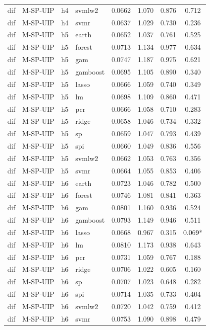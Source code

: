 \begin{ThreePartTable}
\begin{longtable}[t]{llclcccc}
dif & M-SP-UIP & h4 & svmlw2 & 0.0662 & 1.070 & 0.876 & 0.712\\
dif & M-SP-UIP & h4 & svmr & 0.0637 & 1.029 & 0.730 & 0.236\\
\addlinespace
dif & M-SP-UIP & h5 & earth & 0.0652 & 1.037 & 0.761 & 0.525\\
dif & M-SP-UIP & h5 & forest & 0.0713 & 1.134 & 0.977 & 0.634\\
dif & M-SP-UIP & h5 & gam & 0.0747 & 1.187 & 0.975 & 0.621\\
dif & M-SP-UIP & h5 & gamboost & 0.0695 & 1.105 & 0.890 & 0.340\\
dif & M-SP-UIP & h5 & lasso & 0.0666 & 1.059 & 0.740 & 0.349\\
dif & M-SP-UIP & h5 & lm & 0.0698 & 1.109 & 0.860 & 0.471\\
dif & M-SP-UIP & h5 & pcr & 0.0666 & 1.058 & 0.710 & 0.283\\
dif & M-SP-UIP & h5 & ridge & 0.0658 & 1.046 & 0.734 & 0.332\\
dif & M-SP-UIP & h5 & sp & 0.0659 & 1.047 & 0.793 & 0.439\\
dif & M-SP-UIP & h5 & spi & 0.0660 & 1.049 & 0.836 & 0.556\\
dif & M-SP-UIP & h5 & svmlw2 & 0.0662 & 1.053 & 0.763 & 0.356\\
dif & M-SP-UIP & h5 & svmr & 0.0664 & 1.055 & 0.853 & 0.406\\
\addlinespace
dif & M-SP-UIP & h6 & earth & 0.0723 & 1.046 & 0.782 & 0.500\\
dif & M-SP-UIP & h6 & forest & 0.0746 & 1.081 & 0.841 & 0.363\\
dif & M-SP-UIP & h6 & gam & 0.0801 & 1.160 & 0.936 & 0.524\\
dif & M-SP-UIP & h6 & gamboost & 0.0793 & 1.149 & 0.946 & 0.511\\
dif & M-SP-UIP & h6 & lasso & 0.0668 & 0.967 & 0.315 & 0.069*\\
dif & M-SP-UIP & h6 & lm & 0.0810 & 1.173 & 0.938 & 0.643\\
dif & M-SP-UIP & h6 & pcr & 0.0731 & 1.059 & 0.767 & 0.188\\
dif & M-SP-UIP & h6 & ridge & 0.0706 & 1.022 & 0.605 & 0.160\\
dif & M-SP-UIP & h6 & sp & 0.0707 & 1.023 & 0.648 & 0.282\\
dif & M-SP-UIP & h6 & spi & 0.0714 & 1.035 & 0.733 & 0.404\\
dif & M-SP-UIP & h6 & svmlw2 & 0.0720 & 1.042 & 0.759 & 0.412\\
dif & M-SP-UIP & h6 & svmr & 0.0753 & 1.090 & 0.898 & 0.479\\

\end{longtable}
\end{ThreePartTable}
